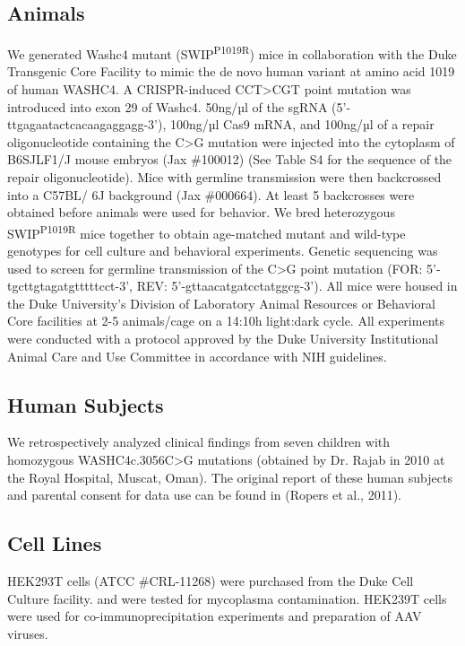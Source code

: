 
\subsection{Animals}

We generated Washc4 mutant (SWIP\textsuperscript{P1019R}) mice in collaboration
with the Duke Transgenic Core Facility to mimic the de novo human variant at
amino acid 1019 of human WASHC4. A CRISPR-induced CCT>CGT point mutation was
introduced into exon 29 of Washc4. 50ng/µl of the sgRNA
(5'-ttgagaatactcacaagaggagg-3'), 100ng/µl Cas9 mRNA, and 100ng/µl of a repair
oligonucleotide containing the C>G mutation were injected into the cytoplasm of
B6SJLF1/J mouse embryos (Jax \#100012) (See Table S4 for the sequence of the
repair oligonucleotide). Mice with germline transmission were then backcrossed
into a C57BL/ 6J background (Jax \#000664). At least 5 backcrosses were obtained
before animals were used for behavior. We bred heterozygous
SWIP\textsuperscript{P1019R} mice together to obtain age-matched mutant and
wild-type genotypes for cell culture and behavioral experiments.  Genetic
sequencing was used to screen for germline transmission of the C>G point
mutation (FOR: 5'-tgcttgtagatgtttttcct-3', REV: 5'-gttaacatgatcctatggcg-3'). All
mice were housed in the Duke University's Division of Laboratory Animal
Resources or Behavioral Core facilities at 2-5 animals/cage on a 14:10h
light:dark cycle. All experiments were conducted with a protocol approved by the
Duke University Institutional Animal Care and Use Committee in accordance with
NIH guidelines. 

\subsection{Human Subjects}

We retrospectively analyzed clinical findings from seven children with
homozygous WASHC4c.3056C>G mutations (obtained by Dr. Rajab in 2010 at the Royal
Hospital, Muscat, Oman). The original report of these human subjects and
parental consent for data use can be found in (Ropers et al., 2011). 

\subsection{Cell Lines}

HEK293T cells (ATCC \#CRL-11268) were purchased from the Duke Cell Culture
facility. and were tested for mycoplasma contamination. HEK239T cells were used
for co-immunoprecipitation experiments and preparation of AAV viruses.

